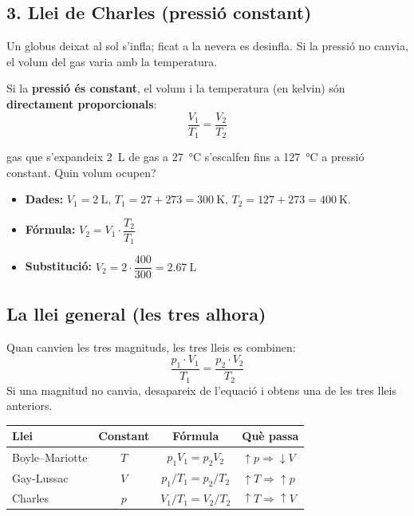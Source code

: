 \subsection*{3. Llei de Charles (pressió constant)}

Un globus deixat al sol s'infla; ficat a la nevera es desinfla. Si la pressió no canvia, el volum del gas varia amb la temperatura.

\begin{idea}
Si la \textbf{pressió és constant}, el volum i la temperatura (en kelvin) són \textbf{directament proporcionals}:
\[ \frac{V_1}{T_1} = \frac{V_2}{T_2} \]
\end{idea}

\begin{exemple}{gas que s'expandeix}
\SI{2}{\liter} de gas a \SI{27}{\degreeCelsius} s'escalfen fins a \SI{127}{\degreeCelsius} a pressió constant. Quin volum ocupen?
\begin{itemize}
 \item \textbf{Dades:} $V_1 = \SI{2}{\liter}$, $T_1 = 27 + 273 = \SI{300}{\kelvin}$, $T_2 = 127 + 273 = \SI{400}{\kelvin}$.
 \item \textbf{Fórmula:} $V_2 = V_1 \cdot \dfrac{T_2}{T_1}$
 \item \textbf{Substitució:} $V_2 = 2 \cdot \dfrac{400}{300} = \SI{2,67}{\liter}$
\end{itemize}
\end{exemple}

\subsection*{La llei general (les tres alhora)}

Quan canvien les tres magnituds, les tres lleis es combinen:
\[ \boxed{\ \frac{p_1 \cdot V_1}{T_1} = \frac{p_2 \cdot V_2}{T_2}\ } \]
Si una magnitud no canvia, desapareix de l'equació i obtens una de les tres lleis anteriors.

\begin{center}
\renewcommand{\arraystretch}{1.5}
\begin{tabular}{@{}lccl@{}}
\toprule
\textbf{Llei} & \textbf{Constant} & \textbf{Fórmula} & \textbf{Què passa}\\
\midrule
Boyle--Mariotte & $T$ & $p_1V_1 = p_2V_2$ & $\uparrow p \Rightarrow \downarrow V$\\
Gay-Lussac & $V$ & $p_1/T_1 = p_2/T_2$ & $\uparrow T \Rightarrow \uparrow p$\\
Charles & $p$ & $V_1/T_1 = V_2/T_2$ & $\uparrow T \Rightarrow \uparrow V$\\
\bottomrule
\end{tabular}
\end{center}

